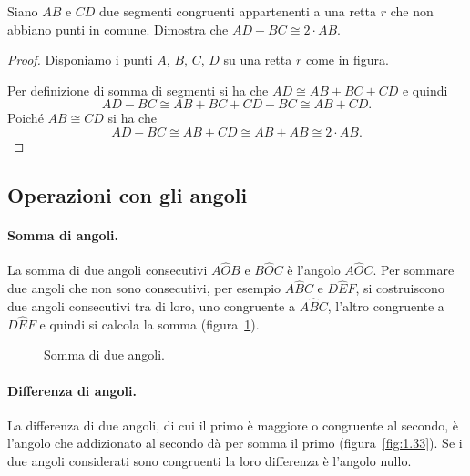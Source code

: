 \begin{exrig}
\begin{esempio}
Siano $AB$ e $CD$ due segmenti congruenti appartenenti a una retta 
$r$ che non abbiano punti in comune. Dimostra che $AD-BC\cong 2\cdot 
AB$.
\begin{proof}
Disponiamo i punti $A$, $B$, $C$, $D$ su una retta $r$ come in figura.

\begin{inaccessibleblock}
 \begin{figure}[htb]
\centering
\end{figure}
\end{inaccessibleblock}

Per definizione di somma di segmenti si ha che $AD\cong AB+BC+CD$ e 
quindi
\[AD-BC\cong AB+BC+CD-BC\cong AB+CD.\]
Poiché $AB\cong CD$ si ha che
\[AD-BC\cong AB+CD\cong AB+AB\cong 2\cdot AB.\]
\end{proof}
\end{esempio}
\end{exrig}

\subsection{Operazioni con gli angoli}

\paragraph{Somma di angoli.} La somma di due angoli consecutivi 
$A\widehat{O}B$ e $B\widehat{O}C$ è l'angolo $A\widehat{O}C$. Per 
sommare due angoli che non sono consecutivi, per esempio 
$A\widehat{B}C$ e $D\widehat{E}F$, si costruiscono due angoli 
consecutivi tra di loro, uno congruente a $A\widehat{B}C$, l'altro 
congruente a $D\widehat{E}F$ e quindi si calcola la somma 
(figura~\ref{fig:1.32}).


\begin{inaccessibleblock}
 \begin{figure}[htb]
\centering
\caption{Somma di due angoli.}\label{fig:1.32}
\end{figure}
\end{inaccessibleblock}

\paragraph{Differenza di angoli.} La differenza di due angoli, di cui 
il primo è maggiore o congruente al secondo, è l'angolo che 
addizionato al secondo dà per somma il primo (figura~\ref{fig:1.33}). 
Se i due angoli considerati sono congruenti la loro differenza è 
l'angolo nullo.


